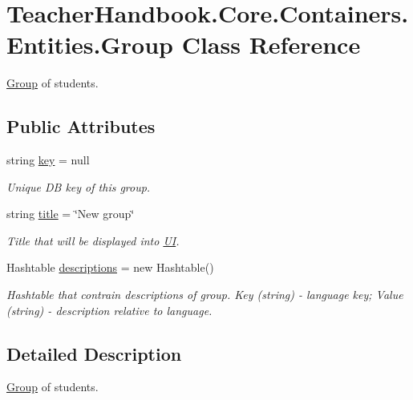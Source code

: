 \hypertarget{class_teacher_handbook_1_1_core_1_1_containers_1_1_entities_1_1_group}{}\section{Teacher\+Handbook.\+Core.\+Containers.\+Entities.\+Group Class Reference}
\label{class_teacher_handbook_1_1_core_1_1_containers_1_1_entities_1_1_group}


\mbox{\hyperlink{class_teacher_handbook_1_1_core_1_1_containers_1_1_entities_1_1_group}{Group}} of students.  


\subsection*{Public Attributes}
\begin{DoxyCompactItemize}
\item 
string \mbox{\hyperlink{class_teacher_handbook_1_1_core_1_1_containers_1_1_entities_1_1_group_a310647f18ded4bc06e52f6840b11d7ea}{key}} = null
\begin{DoxyCompactList}\small\item\em Unique DB key of this group. \end{DoxyCompactList}\item 
string \mbox{\hyperlink{class_teacher_handbook_1_1_core_1_1_containers_1_1_entities_1_1_group_a230fa40688f7bed7e0e6d2fada98665f}{title}} = \char`\"{}New group\char`\"{}
\begin{DoxyCompactList}\small\item\em Title that will be displayed into \mbox{\hyperlink{namespace_teacher_handbook_1_1_u_i}{UI}}. \end{DoxyCompactList}\item 
Hashtable \mbox{\hyperlink{class_teacher_handbook_1_1_core_1_1_containers_1_1_entities_1_1_group_a7332027f3ea328914b304a88aa28b07f}{descriptions}} = new Hashtable()
\begin{DoxyCompactList}\small\item\em Hashtable that contrain descriptions of group. Key (string) -\/ language key; Value (string) -\/ description relative to language. \end{DoxyCompactList}\end{DoxyCompactItemize}


\subsection{Detailed Description}
\mbox{\hyperlink{class_teacher_handbook_1_1_core_1_1_containers_1_1_entities_1_1_group}{Group}} of students. 



